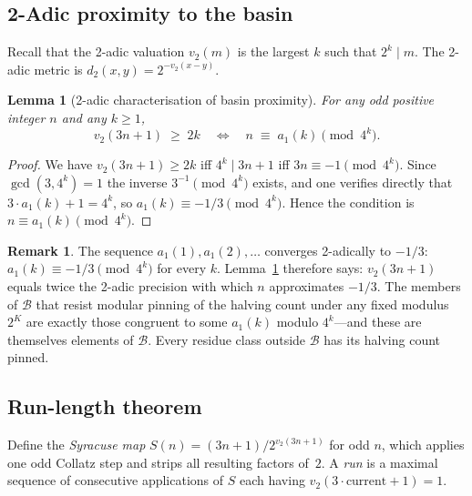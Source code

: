 \documentclass[12pt]{amsart}
\newtheorem{lemma}[theorem]{Lemma}
\theoremstyle{definition}
\newtheorem{remark}[theorem]{Remark}
\newcommand{\basin}{\mathcal{B}}
\begin{document}
\subsection{2-Adic proximity to the basin}

Recall that the 2-adic valuation $v_2(m)$ is the largest $k$ such that
$2^k \mid m$.  The 2-adic metric is $d_2(x,y) = 2^{-v_2(x-y)}$.

\begin{lemma}[2-adic characterisation of basin proximity]
  \label{lem:2adic}
  For any odd positive integer $n$ and any $k \geq 1$,
  \[
    v_2(3n+1) \;\geq\; 2k
    \quad\iff\quad
    n \;\equiv\; a_1(k) \pmod{4^k}.
  \]
\end{lemma}

\begin{proof}
  We have $v_2(3n+1) \geq 2k$ iff $4^k \mid 3n+1$ iff $3n \equiv -1
  \pmod{4^k}$.  Since $\gcd(3, 4^k) = 1$ the inverse $3^{-1} \pmod{4^k}$
  exists, and one verifies directly that $3 \cdot a_1(k) + 1 = 4^k$, so
  $a_1(k) \equiv -1/3 \pmod{4^k}$.  Hence the condition is $n \equiv a_1(k)
  \pmod{4^k}$.
\end{proof}

\begin{remark}
  The sequence $a_1(1), a_1(2), \ldots$ converges 2-adically to $-1/3$:
  $a_1(k) \equiv -1/3 \pmod{4^k}$ for every $k$.
  Lemma~\ref{lem:2adic} therefore says: $v_2(3n+1)$ equals twice the 2-adic
  precision with which $n$ approximates $-1/3$.  The members of $\mathcal{B}$
  that resist modular pinning of the halving count under any fixed modulus
  $2^K$ are exactly those congruent to some $a_1(k)$ modulo $4^k$---and
  these are themselves elements of $\basin$.  Every residue class outside
  $\basin$ has its halving count pinned.
\end{remark}

\subsection{Run-length theorem}

Define the \emph{Syracuse map} $S(n) = (3n+1)/2^{v_2(3n+1)}$ for odd $n$,
which applies one odd Collatz step and strips all resulting factors of~$2$.
A \emph{run} is a maximal sequence of consecutive applications of $S$ each
having $v_2(3 \cdot \text{current} + 1) = 1$.
\end{document}

